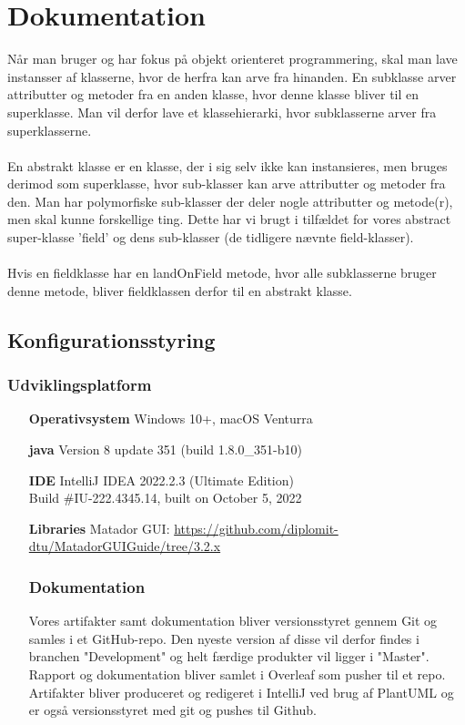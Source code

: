 \documentclass{article}
\begin{document}
\section{Dokumentation}
Når man bruger og har fokus på objekt orienteret programmering, skal man lave instansser af klasserne, hvor de herfra kan arve fra hinanden. En subklasse arver attributter og metoder fra en anden klasse, hvor denne klasse bliver til en superklasse. Man vil derfor lave et klassehierarki, hvor subklasserne arver fra superklasserne. 
\\
\\
En abstrakt klasse er en klasse, der i sig selv ikke kan instansieres, men bruges derimod som superklasse, hvor sub-klasser kan arve attributter og metoder fra den. Man har polymorfiske sub-klasser der deler nogle attributter og metode(r), men skal kunne forskellige ting. Dette har vi brugt i tilfældet for vores abstract super-klasse 'field' og dens sub-klasser (de tidligere nævnte field-klasser).
\\
\\
Hvis en fieldklasse har en landOnField metode, hvor alle subklasserne bruger denne metode, bliver fieldklassen derfor til en abstrakt klasse. 

\subsection{Konfigurationsstyring}
\subsubsection{Udviklingsplatform}
\begin{itemize}
    \item [\textbf{Operativsystem}] Windows 10+, macOS Venturra
    \item [\textbf{java}] Version 8 update 351 (build 1.8.0\_351-b10)
    \item [\textbf{IDE}] IntelliJ IDEA 2022.2.3 (Ultimate Edition)\\
    Build \#IU-222.4345.14, built on October 5, 2022
    \item[\textbf{Libraries}] Matador GUI: \href{https://github.com/diplomit-dtu/MatadorGUIGuide/tree/3.2.x}{https://github.com/diplomit-dtu/MatadorGUIGuide/tree/3.2.x}

 \subsubsection{Dokumentation} Vores artifakter samt dokumentation bliver versionsstyret gennem Git og samles i et GitHub-repo. Den nyeste version af disse vil derfor findes i branchen "Development" og helt færdige produkter vil ligger i "Master".\\
    Rapport og dokumentation bliver samlet i Overleaf som pusher til et repo. Artifakter bliver produceret og redigeret i IntelliJ ved brug af PlantUML og er også versionsstyret med git og pushes til Github.
\end{itemize}
\end{document}
